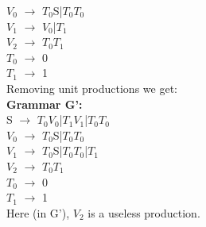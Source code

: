 \documentclass{homework}
\begin{document}
$V_0$ $\rightarrow$ $T_0$S|$T_0T_0$\\
$V_1$ $\rightarrow$ $V_0$|$T_1$\\
$V_2$ $\rightarrow$ $T_0T_1$\\
$T_0$ $\rightarrow$ 0\\
$T_1$ $\rightarrow$ 1\\
\newline
Removing unit productions we get:\\
\textbf{Grammar G':}\\
S $\rightarrow$ $T_0V_0$|$T_1V_1$|$T_0T_0$\\
$V_0$ $\rightarrow$ $T_0$S|$T_0T_0$\\
$V_1$ $\rightarrow$ $T_0$S|$T_0T_0$|$T_1$\\
$V_2$ $\rightarrow$ $T_0T_1$\\
$T_0$ $\rightarrow$ 0\\
$T_1$ $\rightarrow$ 1\\

Here (in G'), $V_2$ is a useless production.
\newline
\end{document}
